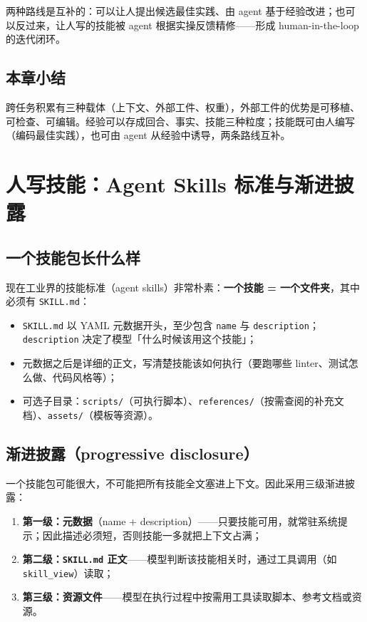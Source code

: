 ﻿\documentclass[a4paper]{article}
\begin{document}
两种路线是互补的：可以让人提出候选最佳实践、由 agent 基于经验改进；也可以反过来，让人写的技能被 agent 根据实操反馈精修——形成 human-in-the-loop 的迭代闭环。

\subsection{本章小结}
跨任务积累有三种载体（上下文、外部工件、权重），外部工件的优势是可移植、可检查、可编辑。经验可以存成回合、事实、技能三种粒度；技能既可由人编写（编码最佳实践），也可由 agent 从经验中诱导，两条路线互补。

\section{人写技能：Agent Skills 标准与渐进披露}

\subsection{一个技能包长什么样}

现在工业界的技能标准（agent skills）非常朴素：\textbf{一个技能 = 一个文件夹}，其中必须有 \texttt{SKILL.md}：

\begin{itemize}
\item \texttt{SKILL.md} 以 YAML 元数据开头，至少包含 \texttt{name} 与 \texttt{description}；\texttt{description} 决定了模型「什么时候该用这个技能」；
\item 元数据之后是详细的正文，写清楚技能该如何执行（要跑哪些 linter、测试怎么做、代码风格等）；
\item 可选子目录：\texttt{scripts/}（可执行脚本）、\texttt{references/}（按需查阅的补充文档）、\texttt{assets/}（模板等资源）。
\end{itemize}

\subsection{渐进披露（progressive disclosure）}

一个技能包可能很大，不可能把所有技能全文塞进上下文。因此采用三级渐进披露：

\begin{enumerate}
\item \textbf{第一级：元数据}（name + description）——只要技能可用，就常驻系统提示；因此描述必须短，否则技能一多就把上下文占满；
\item \textbf{第二级：\texttt{SKILL.md} 正文}——模型判断该技能相关时，通过工具调用（如 \texttt{skill\_view}）读取；
\item \textbf{第三级：资源文件}——模型在执行过程中按需用工具读取脚本、参考文档或资源。
\end{enumerate}
\end{document}
